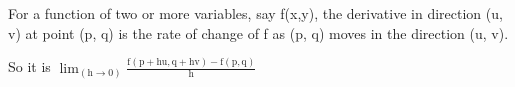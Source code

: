 For a function of two or more variables, say f(x,y), the derivative in direction
(u, v) at point (p, q) is the rate of change of f as (p, q) 
moves in the direction (u, v). 
\par
So it is $ \lim_{(\mathrm{h} \to 0)} \frac {\mathrm{f(p+hu, q+hv)-f(p,q)}}{\mathrm{h}} $ 